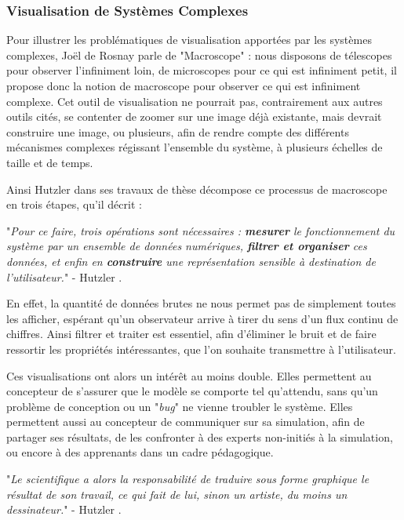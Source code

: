 		\subsubsection{Visualisation de Systèmes Complexes}
		\label{sectionVisuComplexe}
		
		Pour illustrer les problématiques de visualisation apportées par les systèmes complexes, Joël de Rosnay parle de "Macroscope" \cite{de_rosnay_macroscope_1975} : nous disposons de télescopes pour observer l'infiniment loin, de microscopes pour ce qui est infiniment petit, il propose donc la notion de macroscope pour observer ce qui est infiniment complexe. Cet outil de visualisation ne pourrait pas, contrairement aux autres outils cités, se contenter de zoomer sur une image déjà existante, mais devrait construire une image, ou plusieurs, afin de rendre compte des différents mécanismes complexes régissant l'ensemble du système, à plusieurs échelles de taille et de temps.
		
		Ainsi Hutzler dans ses travaux de thèse \cite{hutzler_du_2000} décompose ce processus de macroscope en trois étapes, qu'il décrit :
		
		"\textit{Pour ce faire, trois opérations sont nécessaires : \textbf{mesurer} le fonctionnement du système par un ensemble de données numériques, \textbf{filtrer et organiser} ces données, et enfin en \textbf{construire} une représentation sensible à destination de l'utilisateur.}" - Hutzler \cite{hutzler_du_2000}.

	En effet, la quantité de données brutes ne nous permet pas de simplement toutes les afficher, espérant qu'un observateur arrive à tirer du sens d'un flux continu de chiffres. Ainsi filtrer et traiter est essentiel, afin d'éliminer le bruit et de faire ressortir les propriétés intéressantes, que l'on souhaite transmettre à l'utilisateur.

		
		 Ces visualisations ont alors un intérêt au moins double. Elles permettent au concepteur de s'assurer que le modèle se comporte tel qu'attendu, sans qu'un problème de conception ou un "\textit{bug}" ne vienne troubler le système. Elles permettent aussi au concepteur de communiquer sur sa simulation, afin de partager ses résultats, de les confronter à des experts non-initiés à la simulation, ou encore à des apprenants dans un cadre pédagogique.

		"\textit{Le scientifique a alors la responsabilité de traduire sous forme graphique le résultat de son travail, ce qui fait de lui, sinon un artiste, du moins un dessinateur.}" - Hutzler \cite{hutzler_du_2000}.

